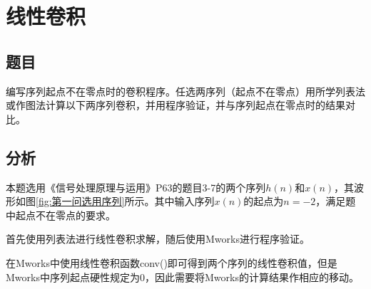 \documentclass{ctexart}
\begin{document}
	\section{线性卷积}
		\subsection{题目}
			编写序列起点不在零点时的卷积程序。任选两序列（起点不在零点）用所学列表法或作图法计算以下两序列卷积，并用程序验证，并与序列起点在零点时的结果对比。
		\subsection{分析}
			本题选用《信号处理原理与运用》P63的题目3-7的两个序列$h(n)$和$x(n)$，其波形如图\ref{fig:第一问选用序列}所示。其中输入序列$x(n)$的起点为$n=-2$，满足题中起点不在零点的要求。\par
			首先使用列表法进行线性卷积求解，随后使用Mworks进行程序验证。\par
			在Mworks中使用线性卷积函数conv()即可得到两个序列的线性卷积值，但是Mworks中序列起点硬性规定为0，因此需要将Mworks的计算结果作相应的移动。
\end{document}
